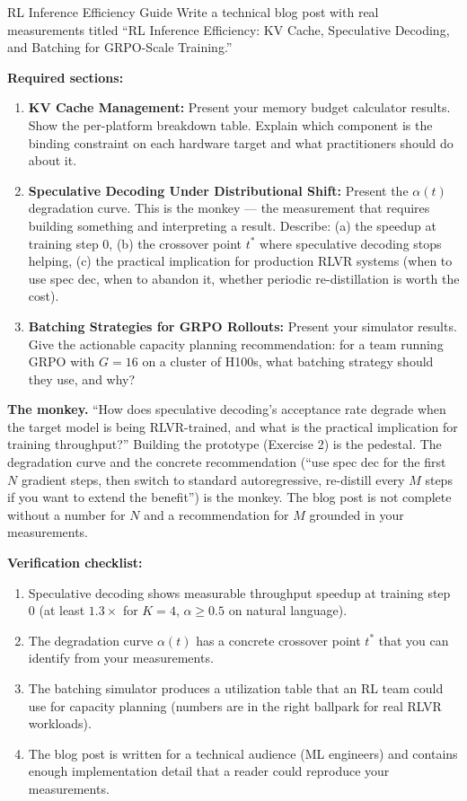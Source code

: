 \begin{portfolio}{RL Inference Efficiency Guide}
Write a technical blog post with real measurements titled ``RL Inference Efficiency: KV Cache, Speculative Decoding, and Batching for GRPO-Scale Training.''

\textbf{Required sections:}
\begin{enumerate}
  \item \textbf{KV Cache Management:} Present your memory budget calculator results. Show the per-platform breakdown table. Explain which component is the binding constraint on each hardware target and what practitioners should do about it.
  \item \textbf{Speculative Decoding Under Distributional Shift:} Present the $\alpha(t)$ degradation curve. This is the monkey --- the measurement that requires building something and interpreting a result. Describe: (a) the speedup at training step 0, (b) the crossover point $t^*$ where speculative decoding stops helping, (c) the practical implication for production RLVR systems (when to use spec dec, when to abandon it, whether periodic re-distillation is worth the cost).
  \item \textbf{Batching Strategies for GRPO Rollouts:} Present your simulator results. Give the actionable capacity planning recommendation: for a team running GRPO with $G = 16$ on a cluster of H100s, what batching strategy should they use, and why?
\end{enumerate}

\textbf{The monkey.} ``How does speculative decoding's acceptance rate degrade when the target model is being RLVR-trained, and what is the practical implication for training throughput?'' Building the prototype (Exercise 2) is the pedestal. The degradation curve and the concrete recommendation (``use spec dec for the first $N$ gradient steps, then switch to standard autoregressive, re-distill every $M$ steps if you want to extend the benefit'') is the monkey. The blog post is not complete without a number for $N$ and a recommendation for $M$ grounded in your measurements.

\textbf{Verification checklist:}
\begin{enumerate}
  \item Speculative decoding shows measurable throughput speedup at training step 0 (at least $1.3\times$ for $K = 4$, $\alpha \geq 0.5$ on natural language).
  \item The degradation curve $\alpha(t)$ has a concrete crossover point $t^*$ that you can identify from your measurements.
  \item The batching simulator produces a utilization table that an RL team could use for capacity planning (numbers are in the right ballpark for real RLVR workloads).
  \item The blog post is written for a technical audience (ML engineers) and contains enough implementation detail that a reader could reproduce your measurements.
\end{enumerate}
\end{portfolio}

\newpage
